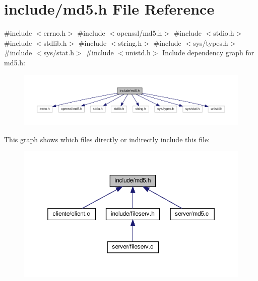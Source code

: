 \section{include/md5.h File Reference}
\label{md5_8h}
{\ttfamily \#include $<$errno.\+h$>$}\newline
{\ttfamily \#include $<$openssl/md5.\+h$>$}\newline
{\ttfamily \#include $<$stdio.\+h$>$}\newline
{\ttfamily \#include $<$stdlib.\+h$>$}\newline
{\ttfamily \#include $<$string.\+h$>$}\newline
{\ttfamily \#include $<$sys/types.\+h$>$}\newline
{\ttfamily \#include $<$sys/stat.\+h$>$}\newline
{\ttfamily \#include $<$unistd.\+h$>$}\newline
Include dependency graph for md5.\+h\+:
\nopagebreak
\begin{figure}[H]
\begin{center}
\leavevmode
\includegraphics[width=350pt]{md5_8h__incl}
\end{center}
\end{figure}
This graph shows which files directly or indirectly include this file\+:
\nopagebreak
\begin{figure}[H]
\begin{center}
\leavevmode
\includegraphics[width=350pt]{md5_8h__dep__incl}
\end{center}
\end{figure}
